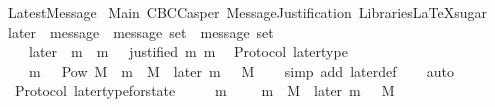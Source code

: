 %
\begin{isabellebody}%
%
%
\isadelimdocument
%
\endisadelimdocument
%
\isatagdocument
%
\isamarkuptrue%
%
\endisatagdocument
{\isafolddocument}%
%
\isadelimdocument
%
\endisadelimdocument
%
\isadelimtheory
%
\endisadelimtheory
%
\isatagtheory
{}\isamarkupfalse%
\ LatestMessage\isanewline
\isanewline
{}\ Main\ CBCCasper\ MessageJustification\ {\isachardoublequoteopen}Libraries{\isacharslash}LaTeXsugar{\isachardoublequoteclose}\isanewline
\isanewline
{}%
\endisatagtheory
{\isafoldtheory}%
%
\isadelimtheory
\isanewline
%
\endisadelimtheory
\isanewline
\isanewline
\isanewline
\isanewline
\isanewline
\isanewline
\isanewline
\isanewline
{}\isamarkupfalse%
\ later\ {\isacharcolon}{\isacharcolon}\ {\isachardoublequoteopen}{\isacharparenleft}message\ {\isacharasterisk}\ message\ set{\isacharparenright}\ {\isasymRightarrow}\ message\ set{\isachardoublequoteclose}\isanewline
\ \ \isanewline
\ \ \ \ {\isachardoublequoteopen}later\ {\isacharequal}\ {\isacharparenleft}{\isasymlambda}{\isacharparenleft}m{\isacharcomma}\ {\isasymsigma}{\isacharparenright}{\isachardot}\ {\isacharbraceleft}m{\isacharprime}\ {\isasymin}\ {\isasymsigma}{\isachardot}\ justified\ m\ m{\isacharprime}{\isacharbraceright}{\isacharparenright}{\isachardoublequoteclose}\isanewline
\isanewline
{}\isamarkupfalse%
\ {\isacharparenleft}\ Protocol{\isacharparenright}\ later{\isacharunderscore}type\ {\isacharcolon}\isanewline
\ \ {\isachardoublequoteopen}{\isasymforall}\ {\isasymsigma}\ m{\isachardot}\ {\isasymsigma}\ {\isasymin}\ Pow\ M\ {\isasymand}\ m\ {\isasymin}\ M\ {\isasymlongrightarrow}\ later\ {\isacharparenleft}m{\isacharcomma}\ {\isasymsigma}{\isacharparenright}\ {\isasymsubseteq}\ M{\isachardoublequoteclose}\isanewline
%
\isadelimproof
\ \ %
\endisadelimproof
%
\isatagproof
{}\isamarkupfalse%
\ {\isacharparenleft}simp\ add{\isacharcolon}\ later{\isacharunderscore}def{\isacharparenright}\isanewline
\ \ \isamarkupfalse%
\ auto%
\endisatagproof
{\isafoldproof}%
%
\isadelimproof
\isanewline
%
\endisadelimproof
\isanewline
{}\isamarkupfalse%
\ {\isacharparenleft}\ Protocol{\isacharparenright}\ later{\isacharunderscore}type{\isacharunderscore}for{\isacharunderscore}state\ {\isacharcolon}\isanewline
\ \ {\isachardoublequoteopen}{\isasymforall}\ {\isasymsigma}\ m{\isachardot}\ {\isasymsigma}\ {\isasymin}\ {\isasymSigma}\ {\isasymand}\ m\ {\isasymin}\ M\ {\isasymlongrightarrow}\ later\ {\isacharparenleft}m{\isacharcomma}\ {\isasymsigma}{\isacharparenright}\ {\isasymsubseteq}\ M{\isachardoublequoteclose}\isanewline

\end{isabellebody}
